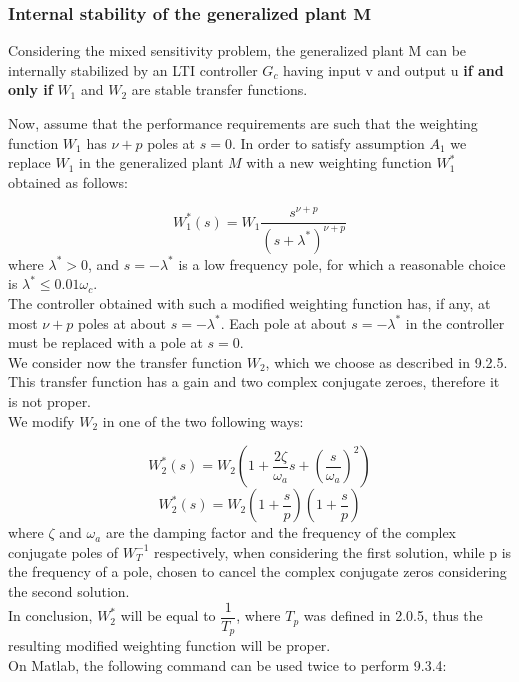 \documentclass[a4paper,10pt,titlepage]{article}
\numberwithin{equation}{subsection}
\begin{document}
	\subsubsection{Internal stability of the generalized plant $\bm{M}$}
	Considering the mixed sensitivity problem, the generalized plant M can be internally stabilized by an LTI controller $G_c$ having input v and output u \textbf{if and only if} $W_1$ and $W_2$ are stable transfer functions.
	
	\vspace{2pt}
	Now, assume that the performance requirements are such that the weighting function $W_1$ has $\nu+p$ poles at $s=0$. In order to satisfy assumption $A_1$ we replace $W_1$ in the generalized plant $M$ with a new weighting function $W_1^*$ obtained as follows:
	
	\begin{equation}
		W_1^*(s) = W_1 \dfrac{s^{\nu+p}}{(s+\lambda^*)^{\nu+p}}
	\end{equation}
	where $\lambda^* > 0$, and $s=-\lambda^*$ is a low frequency pole, for which a reasonable choice is $\lambda^* \leq 0.01\omega_c$.\\
	The controller obtained with such a modified weighting function has, if any, at most $\nu+p$ poles at about $s=-\lambda^*$. Each pole at about $s=-\lambda^*$ in the controller must be replaced with a pole at $s=0$.\\
	\vspace{2pt}
	We consider now the transfer function $W_2$, which we choose as described in 9.2.5. This transfer function has a gain and two complex conjugate zeroes, therefore it is not proper.\\
	We modify $W_2$ in one of the two following ways:
	
	\begin{equation}
		W_2^*(s) = W_2 \left( 1+\dfrac{2\zeta}{\omega_a}s+\left(\dfrac{s}{\omega_a}\right)^2 \right)
	\end{equation}
	\begin{equation}
		W_2^*(s) = W_2 \left( 1+\dfrac{s}{p} \right) \left( 1+\dfrac{s}{p} \right)
	\end{equation}
	where $\zeta$ and $\omega_a$ are the damping factor and the frequency of the complex conjugate poles of $W_T^{-1}$ respectively, when considering the first solution, while p is the frequency of a pole, chosen to cancel the complex conjugate zeros considering the second solution.\\
	In conclusion, $W_2^*$ will be equal to $\dfrac{1}{T_p}$, where $T_p$ was defined in 2.0.5, thus the resulting modified weighting function will be proper.\\
	\vspace{2pt}
	On Matlab, the following command can be used twice to perform 9.3.4:
	
\end{document}
